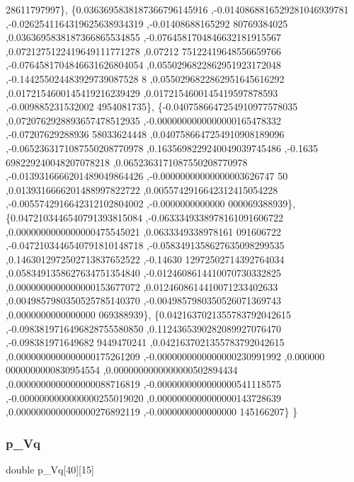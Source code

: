 \begin{DoxyCode}
      28611797997\},
\{0.0363695838187366796145916 ,-0.0140868816529281046939781 ,-0.0262541164319625638934319 ,-0.01408688165292
      80769384025 ,0.0363695838187366865534855 ,-0.0764581704846632181915567 ,0.0721275122419649111771278 ,0.07212
      75122419648556659766 ,-0.0764581704846631626804054 ,0.0550296822862951923172048 ,-0.144255024483929739087528
      8 ,0.0550296822862951645616292 ,0.0172154600145419216239429 ,0.0172154600145419597878593 ,-0.009885231532002
      4954081735\},
\{-0.0407586647254910977578035 ,0.0720762928893657478512935 ,-0.0000000000000000165478332 ,-0.07207629288936
      58033624448 ,0.0407586647254910908189096 ,-0.0652363171087550208770978 ,0.1635698229240049039745486 ,-0.1635
      698229240048207078218 ,0.0652363171087550208770978 ,-0.0139316666201489049864426 ,-0.00000000000000003626747
      50 ,0.0139316666201488997822722 ,0.0055742916642312415054228 ,-0.0055742916642312102804002 ,-0.0000000000000
      000069388939\},
\{0.0472103446540791393815084 ,-0.0633349338978161091606722 ,0.0000000000000000475545021 ,0.0633349338978161
      091606722 ,-0.0472103446540791810148718 ,-0.0583491358627635098299535 ,0.1463012972502713837652522 ,-0.14630
      12972502714392764034 ,0.0583491358627634751354840 ,-0.0124608614410070730332825 ,0.0000000000000000153677072
       ,0.0124608614410071233402633 ,0.0049857980350525785140370 ,-0.0049857980350526071369743 ,0.0000000000000000
      069388939\},
\{0.0421637021355783792042615 ,-0.0983819716496828755580850 ,0.1124365390282089927076470 ,-0.098381971649682
      9449470241 ,0.0421637021355783792042615 ,0.0000000000000000175261209 ,-0.0000000000000000230991992 ,0.000000
      0000000000830954554 ,0.0000000000000000502894434 ,0.0000000000000000088716819 ,-0.0000000000000000541118575 
      ,-0.0000000000000000255019020 ,0.0000000000000000143728639 ,0.0000000000000000276892119 ,-0.0000000000000000
      145166207\}
\}
\end{DoxyCode}
\mbox{\label{a00455_a626aec3cd6c48916b072696ab8a2905e}} 
\subsubsection{\texorpdfstring{p\+\_\+\+Vq}{p\_Vq}}
{\footnotesize\ttfamily double p\+\_\+\+Vq\mbox{[}40\mbox{]}\mbox{[}15\mbox{]}}

